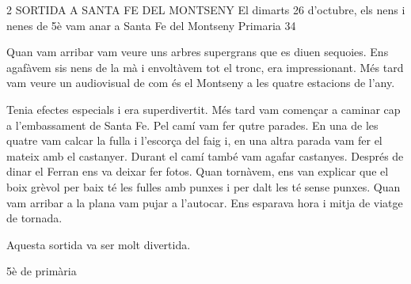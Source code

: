 %
%

\begin{news}
{2} %
{SORTIDA A SANTA FE DEL MONTSENY}
{El dimarts 26 d'octubre,  els nens i nenes de 5è vam anar a Santa Fe del Montseny}
{Primaria}
{34}

\noindent{}


 Quan vam arribar vam veure uns arbres supergrans que es diuen sequoies. Ens agafàvem sis nens de la mà i envoltàvem tot el tronc, era impressionant. Més tard vam veure un audiovisual de com és el Montseny a les quatre estacions de l'any.

 Tenia efectes especials i era superdivertit. Més tard vam començar a caminar cap a l'embassament de Santa Fe. Pel camí vam fer qutre parades. En una de les quatre vam calcar la fulla i l'escorça del faig i, en una altra parada vam fer el mateix amb el castanyer. Durant el camí també  vam agafar castanyes. Després de dinar el Ferran ens va deixar fer fotos. Quan tornàvem,  ens van explicar que el boix grèvol per  baix té les fulles amb punxes i per dalt les té sense punxes. Quan vam arribar a la plana vam pujar a l'autocar. Ens esparava hora i mitja de viatge de tornada.


Aquesta sortida va ser molt divertida.


							{5è de primària}

\end{news}

